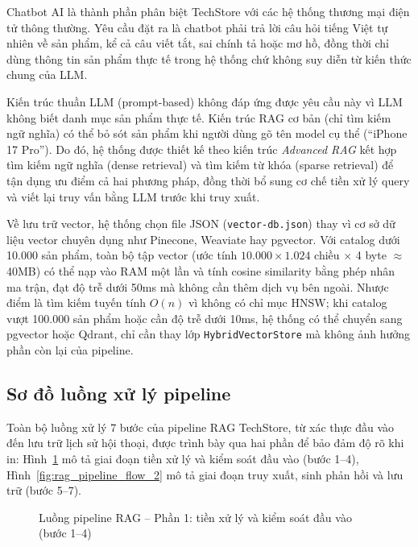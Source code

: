 Chatbot AI là thành phần phân biệt TechStore với các hệ thống thương mại điện tử thông thường. Yêu cầu đặt ra là chatbot phải trả lời câu hỏi tiếng Việt tự nhiên về sản phẩm, kể cả câu viết tắt, sai chính tả hoặc mơ hồ, đồng thời chỉ dùng thông tin sản phẩm thực tế trong hệ thống chứ không suy diễn từ kiến thức chung của LLM.

Kiến trúc thuần LLM (prompt-based) không đáp ứng được yêu cầu này vì LLM không biết danh mục sản phẩm thực tế. Kiến trúc RAG cơ bản (chỉ tìm kiếm ngữ nghĩa) có thể bỏ sót sản phẩm khi người dùng gõ tên model cụ thể (``iPhone 17 Pro''). Do đó, hệ thống được thiết kế theo kiến trúc \textit{Advanced RAG} kết hợp tìm kiếm ngữ nghĩa (dense retrieval) và tìm kiếm từ khóa (sparse retrieval) để tận dụng ưu điểm cả hai phương pháp, đồng thời bổ sung cơ chế tiền xử lý query và viết lại truy vấn bằng LLM trước khi truy xuất.

Về lưu trữ vector, hệ thống chọn file JSON (\texttt{vector-db.json}) thay vì cơ sở dữ liệu vector chuyên dụng như Pinecone, Weaviate hay pgvector. Với catalog dưới 10.000 sản phẩm, toàn bộ tập vector (ước tính $10.000 \times 1.024$ chiều $\times$ 4 byte $\approx$ 40MB) có thể nạp vào RAM một lần và tính cosine similarity bằng phép nhân ma trận, đạt độ trễ dưới 50ms mà không cần thêm dịch vụ bên ngoài. Nhược điểm là tìm kiếm tuyến tính $O(n)$ vì không có chỉ mục HNSW; khi catalog vượt 100.000 sản phẩm hoặc cần độ trễ dưới 10ms, hệ thống có thể chuyển sang pgvector hoặc Qdrant, chỉ cần thay lớp \texttt{HybridVectorStore} mà không ảnh hưởng phần còn lại của pipeline.

\subsection{Sơ đồ luồng xử lý pipeline}

Toàn bộ luồng xử lý 7 bước của pipeline RAG TechStore, từ xác thực đầu vào đến lưu trữ lịch sử hội thoại, được trình bày qua hai phần để bảo đảm độ rõ khi in: Hình~\ref{fig:rag_pipeline_flow_1} mô tả giai đoạn tiền xử lý và kiểm soát đầu vào (bước 1--4), Hình~\ref{fig:rag_pipeline_flow_2} mô tả giai đoạn truy xuất, sinh phản hồi và lưu trữ (bước 5--7).

\begin{figure}[H]
  \centering
  \caption{Luồng pipeline RAG -- Phần 1: tiền xử lý và kiểm soát đầu vào (bước 1--4)}
  \label{fig:rag_pipeline_flow_1}
\end{figure}

